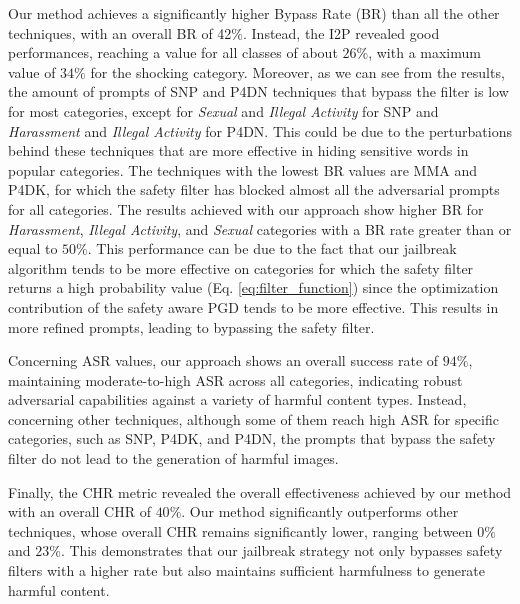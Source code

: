\documentclass[acmsmall]{acmart}
\begin{document}
{Our method achieves a significantly higher Bypass Rate (BR) than all the other techniques, with an overall BR of 42\%. Instead, the I2P revealed good performances, reaching a value for all classes of  about $26\%$, with a maximum value of $34\%$ for the shocking category.  Moreover, as we can see from the results, the amount of prompts of SNP and P4DN techniques that bypass the filter is low for most categories, except for \textit{Sexual} and \textit{Illegal Activity} for SNP and \textit{Harassment} and \textit{Illegal Activity} for P4DN. This could be due to the perturbations behind these techniques that are more effective in hiding sensitive words in popular categories.
The techniques with the lowest BR values are MMA and P4DK, for which the safety filter has blocked almost all the adversarial prompts for all categories. The results achieved with our approach show higher BR for \textit{Harassment}, \textit{Illegal Activity}, and \textit{Sexual} categories with a BR rate greater than or equal to $50\%$. 
This performance can be due to the fact that our jailbreak algorithm tends to be more effective on categories for which the safety filter returns a high probability value (Eq. \ref{eq:filter_function}) since the optimization contribution of the safety aware PGD tends to be more effective. This results in more refined prompts, leading to bypassing the safety filter.

Concerning ASR values, our approach shows an overall success rate of $94\%$, maintaining moderate-to-high ASR across all categories, indicating robust adversarial capabilities against a variety of harmful content types. Instead, concerning other techniques, although some of them reach high ASR for specific categories, such as SNP, P4DK, and P4DN, the prompts that bypass the safety filter do not lead to the generation of harmful images.

Finally, the CHR metric revealed the overall effectiveness achieved by our method with an overall CHR of $40\%$. Our method significantly outperforms other techniques, whose overall CHR remains significantly lower, ranging between $0\%$ and $23\%$. 
This demonstrates that our jailbreak strategy not only bypasses safety filters with a higher rate but also maintains sufficient harmfulness to generate harmful content. 
\vspace{-0.3cm}
}
\end{document}
